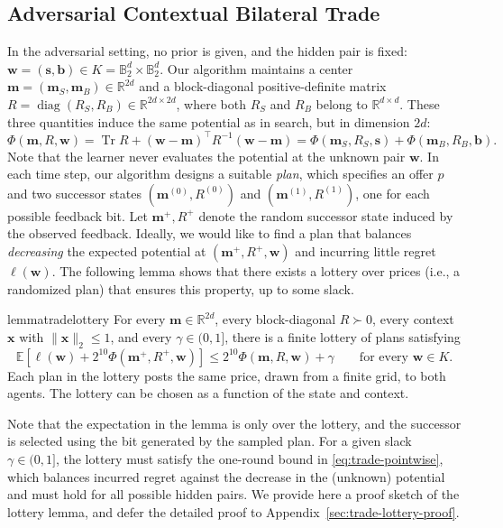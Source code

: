 \documentclass[11pt]{article}
\newcommand{\E}[1]{\mathbb E\left[#1\right]}
\newcommand{\R}{\mathbb R}
\DeclareMathOperator{\Tr}{Tr}
\newcommand{\norm}[1]{\lVert #1\rVert_2}
\newcommand{\bm}{\boldsymbol m}
\newcommand{\bx}{\boldsymbol x}
\begin{document}
\subsection{Adversarial Contextual Bilateral Trade}\label{sec:trade-direct}


{In the adversarial setting, no prior is given, and the hidden pair is fixed:} $\boldsymbol w=(\boldsymbol s,\boldsymbol b)\in K=\mathbb B_2^d\times\mathbb B_2^d$. Our algorithm maintains a center $\bm=(\bm_S,\bm_B)\in\R^{2d}$ and a block-diagonal positive-definite matrix $R=\operatorname{diag}(R_S,R_B) \in \R^{2d \times 2d}$, where both $R_S$ and $R_B$ {belong} to $\R^{d\times d}$. These three quantities induce the same potential as in search, but {in dimension} $2d$:
\begin{equation}\label{eq:trade-quadratic}
 \Phi(\bm,R,\boldsymbol w)
 =\Tr R+(\boldsymbol w-\bm)^\top R^{-1}(\boldsymbol w-\bm)
 =\Phi(\bm_S,R_S,\boldsymbol s)+\Phi(\bm_B,R_B,\boldsymbol b).
\end{equation}
Note that the learner never evaluates the potential at the unknown pair $\boldsymbol{w}$. In each time step, our algorithm designs a suitable \emph{plan}, which specifies an offer $p$ and two successor states $(\bm^{(0)},R^{(0)})$ and $(\bm^{(1)},R^{(1)})$, one for each possible feedback bit. {Let} $\bm^+,R^+$ {denote }the random successor state induced by the {observed feedback}. Ideally, we would like to find a plan that balances \emph{decreasing} the expected potential at $(\bm^+,R^+,\boldsymbol{w})$ and {incurring little regret} $\ell(\boldsymbol{w})$. The following lemma {shows} that there exists a lottery over prices (i.e., a randomized plan) {that ensures this property}, up to some slack.

\begin{restatable}{lemma}{tradelottery}\label{lem:trade-lottery}
For every $\bm\in\R^{2d}$, every block-diagonal $R\succ0$, every context $\bx$ with $\norm{\bx}\le1$, and every $\gamma\in(0,1]$, there is a finite lottery of plans satisfying
\begin{equation}\label{eq:trade-pointwise}
 \E{\ell(\boldsymbol w)+2^{10}\Phi(\bm^+,R^+,\boldsymbol w)}
 \le2^{10}\Phi(\bm,R,\boldsymbol w)+\gamma
 \qquad\text{for every }\boldsymbol w\in K.
\end{equation}
{Each plan in the lottery posts the same price, drawn from a finite grid, to both agents. The lottery can be chosen as a function of the state and context.}
\end{restatable}
{Note that} the expectation in the lemma is only over the lottery, and the successor is selected using the bit generated by {the sampled plan}.
For a given slack $\gamma\in(0,1]$, the lottery must satisfy the one-round bound in \eqref{eq:trade-pointwise}, {which balances incurred regret against the decrease in the (unknown) potential and must hold for all possible hidden pairs.} We provide here a proof sketch of the lottery lemma, and defer the detailed proof to Appendix~\ref{sec:trade-lottery-proof}.
\end{document}
